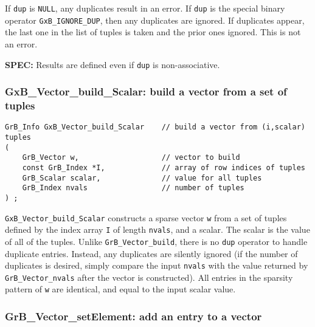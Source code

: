 \documentclass[12pt]{article}
\begin{document}
If \verb'dup' is \verb'NULL', any duplicates result in an error.
If \verb'dup' is the special binary operator \verb'GxB_IGNORE_DUP', then
any duplicates are ignored.  If duplicates appear, the last one in the
list of tuples is taken and the prior ones ignored.  This is not an error.

\begin{alert}
{\bf SPEC:} Results are defined even if \verb'dup' is non-associative.
\end{alert}

\subsubsection{{\sf GxB\_Vector\_build\_Scalar:} build a vector from a set of tuples}
\label{vector_build_Scalar}

\begin{mdframed}[userdefinedwidth=6in]
{\footnotesize
\begin{verbatim}
GrB_Info GxB_Vector_build_Scalar    // build a vector from (i,scalar) tuples
(
    GrB_Vector w,                   // vector to build
    const GrB_Index *I,             // array of row indices of tuples
    GrB_Scalar scalar,              // value for all tuples
    GrB_Index nvals                 // number of tuples
) ;
\end{verbatim} } \end{mdframed}

\verb'GxB_Vector_build_Scalar' constructs a sparse vector \verb'w' from a set
of tuples defined by the index array \verb'I' of length \verb'nvals', and a
scalar.  The scalar is the value of all of the tuples.  Unlike
\verb'GrB_Vector_build', there is no \verb'dup' operator to handle duplicate
entries.  Instead, any duplicates are silently ignored (if the number of
duplicates is desired, simply compare the input \verb'nvals' with the value
returned by \verb'GrB_Vector_nvals' after the vector is constructed).  All
entries in the sparsity pattern of \verb'w' are identical, and equal to the
input scalar value.

\subsubsection{{\sf GrB\_Vector\_setElement:}    add an entry to a vector}
\label{vector_setElement}
\end{document}
